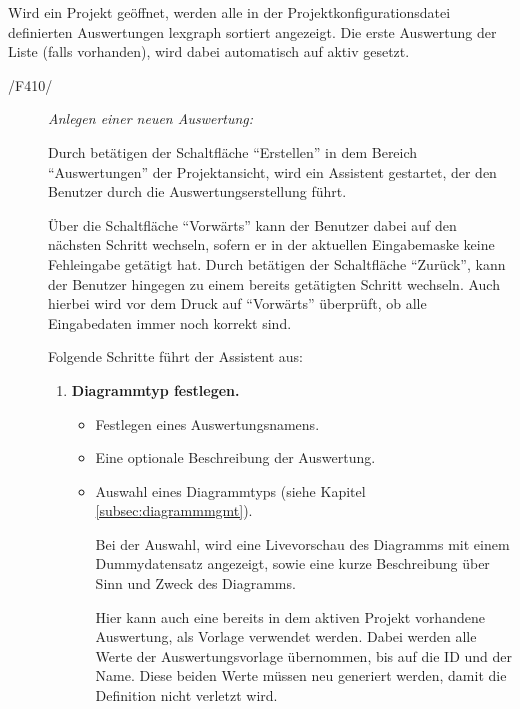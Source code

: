 	Wird ein Projekt geöffnet, werden alle in der Projektkonfigurationsdatei definierten Auswertungen \gls{lexgraph} sortiert angezeigt. Die erste Auswertung der Liste (falls vorhanden), wird dabei automatisch auf aktiv gesetzt.

	\begin{description}
		
		\item[/F410/] \textit{Anlegen einer neuen Auswertung:}\par Durch betätigen der Schaltfläche "`Erstellen"' in dem Bereich "`Auswertungen"' der Projektansicht, wird ein Assistent gestartet, der den Benutzer durch die Auswertungserstellung führt.\par Über die Schaltfläche "`Vorwärts"' kann der Benutzer dabei auf den nächsten Schritt wechseln, sofern er in der aktuellen Eingabemaske keine Fehleingabe getätigt hat. Durch betätigen der Schaltfläche "`Zurück"', kann der Benutzer hingegen zu einem bereits getätigten Schritt wechseln. Auch hierbei wird vor dem Druck auf "`Vorwärts"' überprüft, ob alle Eingabedaten immer noch korrekt sind.\par Folgende Schritte führt der Assistent aus:

			\begin{enumerate}

				\item \textbf{Diagrammtyp festlegen.}

					\begin{itemize}

						\item Festlegen eines Auswertungsnamens.

						\item Eine optionale Beschreibung der Auswertung.

						\item Auswahl eines Diagrammtyps (siehe Kapitel \ref{subsec:diagrammmgmt}).\par Bei der Auswahl, wird eine Livevorschau des Diagramms mit einem Dummydatensatz angezeigt, sowie eine kurze Beschreibung über Sinn und Zweck des Diagramms.\par Hier kann auch eine bereits in dem aktiven Projekt vorhandene Auswertung, als Vorlage verwendet werden. Dabei werden alle Werte der Auswertungsvorlage übernommen, bis auf die ID und der Name. Diese beiden Werte müssen neu generiert werden, damit die Definition nicht verletzt wird.

					\end{itemize}


\end{enumerate}
\end{description}

